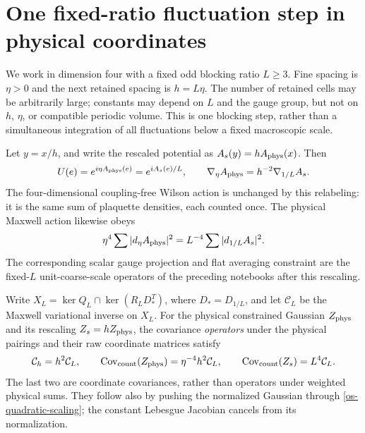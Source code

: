 \section{One fixed-ratio fluctuation step in physical coordinates}
\label{os-section}

We work in dimension four with a fixed odd blocking ratio
$L\ge3$. Fine spacing is $\eta>0$ and the next retained
spacing is $h=L\eta$. The number of retained cells may be
arbitrarily large; constants may depend on $L$ and the gauge
group, but not on $h$, $\eta$, or compatible periodic volume.
This is one blocking step, rather than a simultaneous
integration of all fluctuations below a fixed macroscopic scale.

Let $y=x/h$, and write the rescaled potential as
$A_s(y)=hA_{\rm phys}(x)$. Then
\begin{equation}\label{os-rescaling}
 U(e)=e^{i\eta A_{\rm phys}(e)}=e^{iA_s(e)/L},\qquad
 \nabla_\eta A_{\rm phys}=h^{-2}\nabla_{1/L}A_s.
\end{equation}
The four-dimensional coupling-free Wilson action is unchanged
by this relabeling: it is the same sum of plaquette densities,
each counted once. The physical Maxwell action likewise obeys
\begin{equation}\label{os-quadratic-scaling}
 \eta^4\sum|d_\eta A_{\rm phys}|^2
       =L^{-4}\sum|d_{1/L}A_s|^2.
\end{equation}
The corresponding scalar gauge projection and flat averaging
constraint are the fixed-$L$ unit-coarse-scale operators of
the preceding notebooks after this rescaling.

Write $X_L=\ker Q_L\cap\ker(R_LD_*^T)$, where
$D_*=D_{1/L}$, and let $\mathcal C_L$ be the Maxwell
variational inverse on $X_L$. For the physical constrained
Gaussian $Z_{\rm phys}$ and its rescaling $Z_s=hZ_{\rm phys}$,
the covariance \emph{operators} under the physical pairings
and their raw coordinate matrices satisfy
\begin{equation}\label{os-covariance-scaling}
 \mathcal C_h=h^2\mathcal C_L,\qquad
 \operatorname{Cov}_{\rm count}(Z_{\rm phys})
       =\eta^{-4}h^2\mathcal C_L,\qquad
 \operatorname{Cov}_{\rm count}(Z_s)=L^4\mathcal C_L.
\end{equation}
The last two are coordinate covariances, rather than operators
under weighted physical sums. They follow also by pushing the
normalized Gaussian through \eqref{os-quadratic-scaling};
the constant Lebesgue Jacobian cancels from its normalization.

